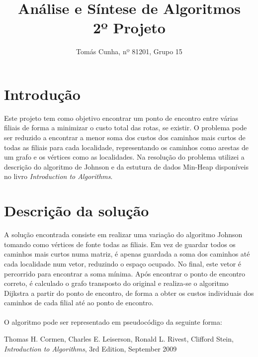 \documentclass[12pt,a4paper,notitlepage]{article}
\begin{document}
\title{\textbf{Análise e Síntese de Algoritmos} \\\large 2º Projeto}
\date{}
\author{Tomás Cunha, nº 81201, Grupo 15}
\maketitle
\section{Introdução}
Este projeto tem como objetivo encontrar um ponto de encontro entre várias filiais de forma a minimizar o custo total das rotas, se existir.
O problema pode ser reduzido a encontrar a menor soma dos custos dos caminhos mais curtos de todas as filiais para cada localidade, representando os caminhos como arestas de um grafo e os vértices como as localidades.
Na resolução do problema utilizei a descrição do algoritmo de Johnson e da estutura de dados Min-Heap disponíveis no livro \emph{Introduction to Algorithms}\cite{algs3ed}.

\section{Descrição da solução}
A solução encontrada consiste em realizar uma variação do algoritmo Johnson tomando como vértices de fonte todas as filiais.
Em vez de guardar todos os caminhos mais curtos numa matriz, é apenas guardada a soma dos caminhos até cada localidade num vetor, reduzindo o espaço ocupado.
No final, este vetor é percorrido para encontrar a soma mínima. 
Após encontrar o ponto de encontro correto, é calculado o grafo transposto do original e realiza-se o algoritmo Dijkstra a partir do ponto de encontro, de forma a obter os custos individuais dos caminhos de cada filial até ao ponto de encontro.
\\
\\
O algoritmo pode ser representado em pseudocódigo da seguinte forma:

\begin{thebibliography}{9}
				Thomas H. Cormen,
				Charles E. Leiserson,
				Ronald L. Rivest,
				Clifford Stein,
				\emph{Introduction to Algorithms},
				3rd Edition,
				September 2009
\end{thebibliography}
\end{document}
